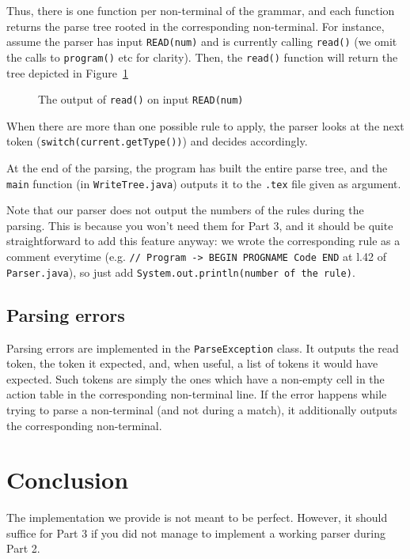 \documentclass[a4paper]{scrartcl}
\begin{document}
Thus, there is one function per non-terminal of the grammar, and each function returns the parse tree rooted in the corresponding non-terminal. For instance, assume the parser has input \texttt{READ(num)} and is currently calling \texttt{read()} (we omit the calls to \texttt{program()} etc for clarity). Then, the \texttt{read()} function will return the tree depicted in Figure~\ref{fig:readTree}

\begin{figure}[ht]
 \centering
\caption{The output of \texttt{read()} on input \texttt{READ(num)}}
\label{fig:readTree}
\end{figure}

When there are more than one possible rule to apply, the parser looks at the next token (\texttt{switch(current.getType())}) and decides accordingly.

At the end of the parsing, the program has built the entire parse tree, and the \texttt{main} function (in \texttt{WriteTree.java}) outputs it to the \texttt{.tex} file given as argument.

Note that our parser does not output the numbers of the rules during the parsing. This is because you won't need them for Part 3, and it should be quite straightforward to add this feature anyway: we wrote the corresponding rule as a comment everytime (e.g. \texttt{// Program -> BEGIN PROGNAME Code END} at l.42 of \texttt{Parser.java}), so just add \texttt{System.out.println(number of the rule)}.

\subsection{Parsing errors}

Parsing errors are implemented in the \texttt{ParseException} class. It outputs the read token, the token it expected, and, when useful, a list of tokens it would have expected. Such tokens are simply the ones which have a non-empty cell in the action table in the corresponding non-terminal line. If the error happens while trying to parse a non-terminal (and not during a match), it additionally outputs the corresponding non-terminal.

\section{Conclusion}

The implementation we provide is not meant to be perfect. However, it should suffice for Part 3 if you did not manage to implement a working parser during Part 2.
\end{document}
